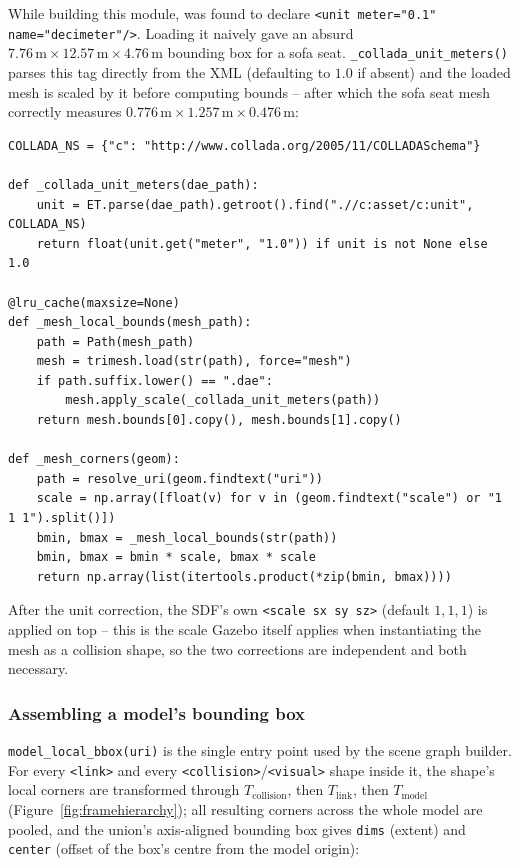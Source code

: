 \documentclass[11pt]{article}
\begin{document}
While building this module,  was found to
declare \texttt{<unit meter="0.1" name="decimeter"/>}. Loading it naively gave
an absurd $7.76\,\text{m} \times 12.57\,\text{m} \times 4.76\,\text{m}$
bounding box for a sofa seat. \texttt{\_collada\_unit\_meters()} parses this
tag directly from the XML (defaulting to $1.0$ if absent) and the loaded mesh
is scaled by it before computing bounds -- after which the sofa seat mesh
correctly measures $0.776\,\text{m} \times 1.257\,\text{m} \times
0.476\,\text{m}$:

\begin{lstlisting}[caption={\texttt{gazebo\_geometry.py}: mesh bounds with COLLADA unit correction}]
COLLADA_NS = {"c": "http://www.collada.org/2005/11/COLLADASchema"}

def _collada_unit_meters(dae_path):
    unit = ET.parse(dae_path).getroot().find(".//c:asset/c:unit", COLLADA_NS)
    return float(unit.get("meter", "1.0")) if unit is not None else 1.0

@lru_cache(maxsize=None)
def _mesh_local_bounds(mesh_path):
    path = Path(mesh_path)
    mesh = trimesh.load(str(path), force="mesh")
    if path.suffix.lower() == ".dae":
        mesh.apply_scale(_collada_unit_meters(path))
    return mesh.bounds[0].copy(), mesh.bounds[1].copy()

def _mesh_corners(geom):
    path = resolve_uri(geom.findtext("uri"))
    scale = np.array([float(v) for v in (geom.findtext("scale") or "1 1 1").split()])
    bmin, bmax = _mesh_local_bounds(str(path))
    bmin, bmax = bmin * scale, bmax * scale
    return np.array(list(itertools.product(*zip(bmin, bmax))))
\end{lstlisting}

After the unit correction, the SDF's own \texttt{<scale sx sy sz>} (default
$1,1,1$) is applied on top -- this is the scale Gazebo itself applies when
instantiating the mesh as a collision shape, so the two corrections are
independent and both necessary.

\subsubsection{Assembling a model's bounding box}
\label{sec:modelbbox}

\texttt{model\_local\_bbox(uri)} is the single entry point used by the scene
graph builder. For every \texttt{<link>} and every
\texttt{<collision>}/\texttt{<visual>} shape inside it, the shape's local
corners are transformed through $T_{\text{collision}}$, then $T_{\text{link}}$,
then $T_{\text{model}}$ (Figure~\ref{fig:framehierarchy}); all resulting
corners across the whole model are pooled, and the union's axis-aligned
bounding box gives \texttt{dims} (extent) and \texttt{center} (offset of the
box's centre from the model origin):
\end{document}

